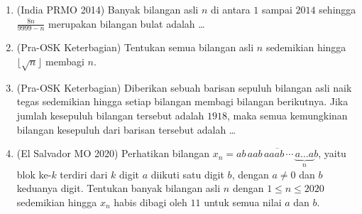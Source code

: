 \documentclass[12pt]{scrartcl}
\begin{document}
\begin{enumerate}
	\item (India PRMO 2014)
	Banyak bilangan asli $n$ di antara $1$ sampai $2014$ sehingga
	$\frac{8n}{9999 - n}$ merupakan bilangan bulat adalah \dots

	\item (Pra-OSK Keterbagian)
	Tentukan semua bilangan asli $n$ sedemikian hingga $\lfloor \sqrt{n} \rfloor$ membagi $n$.

	\item (Pra-OSK Keterbagian)
	Diberikan sebuah barisan sepuluh bilangan asli naik tegas sedemikian hingga
	setiap bilangan membagi bilangan berikutnya.
	Jika jumlah kesepuluh bilangan tersebut adalah $1918$,
	maka semua kemungkinan bilangan kesepuluh dari barisan tersebut adalah \dots

	\item (El Salvador MO 2020)
	Perhatikan bilangan $x_n = \overline{ab\,aab\,aaab\,\cdots\,\underbrace{a\ldots a}_{n}b}$,
	yaitu blok ke-$k$ terdiri dari $k$ digit $a$ diikuti satu digit $b$,
	dengan $a \ne 0$ dan $b$ keduanya digit.
	Tentukan banyak bilangan asli $n$ dengan $1 \le n \le 2020$ sedemikian hingga
	$x_n$ habis dibagi oleh $11$ untuk semua nilai $a$ dan $b$.

\end{enumerate}
\end{document}
